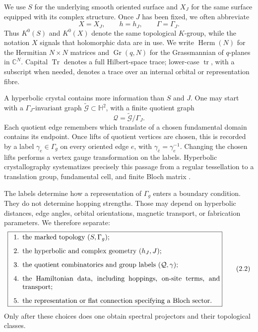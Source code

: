 \documentclass[11pt]{article}
\theoremstyle{definition}
\theoremstyle{remark}
\newcommand{\HH}{\mathbb H}
\newcommand{\CC}{\mathbb C}
\newcommand{\Tr}{\operatorname{Tr}}
\newcommand{\tr}{\operatorname{tr}}
\newcommand{\cG}{\mathcal G}
\begin{document}
We use \(S\) for the underlying smooth oriented surface and \(X_J\) for the
same surface equipped with its complex structure.  Once \(J\) has been
fixed, we often abbreviate
\[
                    X=X_J,\qquad h=h_J,\qquad \Gamma=\Gamma_J.
                    \tag{2.1a}\label{eq:standing-abbreviations}
\]
Thus \(K^0(S)\) and \(K^0(X)\) denote the same topological \(K\)-group, while
the notation \(X\) signals that holomorphic data are in use.  We write
\(\operatorname{Herm}(N)\) for the Hermitian \(N\times N\) matrices and
\(\operatorname{Gr}(q,N)\) for the Grassmannian of \(q\)-planes in
\(\CC^N\).  Capital \(\Tr\) denotes a full Hilbert-space trace; lower-case
\(\tr\), with a subscript when needed, denotes a trace over an internal
orbital or representation fibre.

A hyperbolic crystal contains more information than \(S\) and \(J\).  One may
start with a \(\Gamma_J\)-invariant graph \(\widetilde{\cG}\subset\HH^2\), with
a finite quotient graph
\[
                   \mathcal Q=\widetilde{\cG}/\Gamma_J .
\]
Each quotient edge remembers which translate of a chosen fundamental domain
contains its endpoint.  Once lifts of quotient vertices are chosen, this is
recorded by a label \(\gamma_e\in\Gamma_g\) on every oriented edge \(e\), with
\(\gamma_{\bar e}=\gamma_e^{-1}\).  Changing the chosen lifts performs a
vertex gauge transformation on the labels.  Hyperbolic crystallography
systematizes precisely this passage from a regular tessellation to a
translation group, fundamental cell, and finite Bloch matrix
\cite{BoettcherEtAl2022}.

The labels determine how a representation of \(\Gamma_g\) enters a boundary
condition.  They do not determine hopping strengths.  Those may depend on
hyperbolic distances, edge angles, orbital orientations, magnetic transport,
or fabrication parameters.  We therefore separate:
\[
\boxed{
\begin{minipage}{0.88\linewidth}
\begin{enumerate}[label=\arabic*.,leftmargin=1.8em]
\item the marked topology \((S,\Gamma_g)\);
\item the hyperbolic and complex geometry \((h_J,J)\);
\item the quotient combinatorics and group labels \((\mathcal Q,\gamma)\);
\item the Hamiltonian data, including hoppings, on-site terms, and transport;
\item the representation or flat connection specifying a Bloch sector.
\end{enumerate}
\end{minipage}}
\tag{2.2}\label{eq:input-layers}
\]
Only after these choices does one obtain spectral projectors and their
topological classes.
\end{document}
